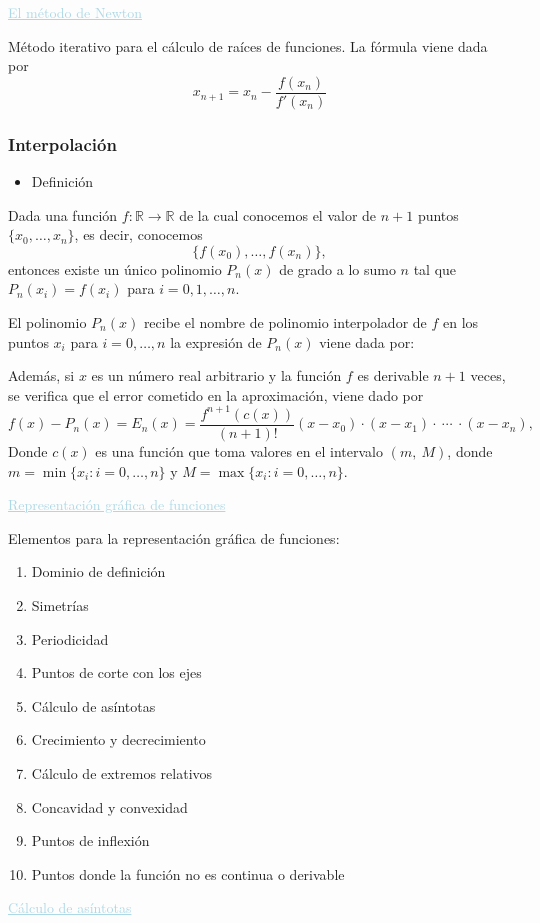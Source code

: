 \textcolor{lightblue}{\underline{El método de Newton}}

Método iterativo para el cálculo de raíces de funciones. La fórmula viene dada por \[ x_{n+1}=x_n-\dfrac{f(x_n)}{f'(x_n)} \]
\subsubsection{Interpolación}
\begin{itemize}[label=\color{red}\textbullet, leftmargin=*]
	\item \color{lightblue}Definición
\end{itemize}
Dada  una función $f:\mathbb{R}\rightarrow\mathbb{R}$ de la cual conocemos el valor de $n+1$ puntos $\{x_0,\hdots,x_n\}$, es decir, conocemos \[ \{f(x_0),\hdots,f(x_n)\}, \] entonces existe un único polinomio $P_n(x)$ de grado a lo sumo $n$ tal que $P_n(x_i)=f(x_i)$ para $i=0,1,\hdots,n$.

El polinomio $P_n(x)$ recibe el nombre de polinomio interpolador de $f$ en los puntos $x_i$ para $i=0,\hdots,n$ la expresión de $P_n(x)$ viene dada por: \begin{center}
\end{center}
Además, si $x$ es un número real arbitrario y la función $f$ es derivable $n+1$ veces, se verifica que el error cometido en la aproximación, viene dado por \[ f(x)-P_n(x)=E_n(x)=\dfrac{f^{n+1}(c(x))}{(n+1)!}(x-x_0)\cdot(x-x_1)\cdot~\cdots~\cdot(x-x_n), \]
Donde $c(x)$ es una función que toma valores en el intervalo $(m,~M)$, donde $m=\min\{x_i:i=0,\hdots,n\}$ y $M=\max\{x_i:i=0,\hdots,n\}$.

\textcolor{lightblue}{\underline{Representación gráfica de funciones}}

Elementos para la representación gráfica de funciones:
\begin{enumerate}[label=\arabic*)]
	\item Dominio de definición
	\item Simetrías
	\item Periodicidad
	\item Puntos de corte con los ejes
	\item Cálculo de asíntotas
	\item Crecimiento y decrecimiento\item Cálculo de extremos relativos
	\item Concavidad y convexidad
	\item Puntos de inflexión
	\item Puntos donde la función no es continua o derivable
\end{enumerate}
\textcolor{lightblue}{\underline{Cálculo de asíntotas}}

